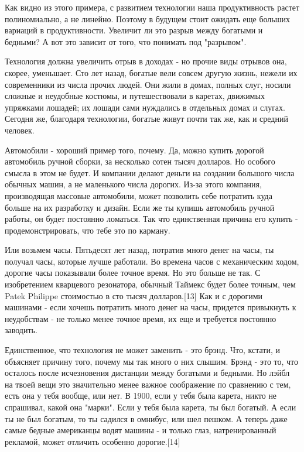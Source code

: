 \documentclass[ebook,12pt,oneside,openany]{memoir}
\begin{document}
Как видно из этого примера, с развитием технологии наша продуктивность
растет полиномиально, а не линейно. Поэтому в будущем стоит ожидать
еще больших вариаций в продуктивности. Увеличит ли это разрыв между
богатыми и бедными? А вот это зависит от того, что понимать под
"разрывом".

Технология должна увеличить отрыв в доходах - но прочие виды отрывов
она, скорее, уменьшает. Сто лет назад, богатые вели совсем другую
жизнь, нежели их современники из числа прочих людей. Они жили в домах,
полных слуг, носили сложные и неудобные костюмы, и путешествовали в
каретах, движимых упряжками лошадей; их лошади сами нуждались в
отдельных домах и слугах. Сегодня же, благодаря технологии, богатые
живут почти так же, как и средний человек.

Автомобили - хороший пример того, почему. Да, можно купить дорогой
автомобиль ручной сборки, за несколько сотен тысяч долларов. Но
особого смысла в этом не будет. И компании делают деньги на создании
большого числа обычных машин, а не маленького числа дорогих. Из-за
этого компания, производящая массовые автомобили, может позволить себе
потратить куда больше на их разработку и дизайн. Если же ты купишь
автомобиль ручной работы, он будет постоянно ломаться. Так что
единственная причина его купить - продемонстрировать, что тебе это по
карману.

Или возьмем часы. Пятьдесят лет назад, потратив много денег на часы,
ты получал часы, которые лучше работали. Во времена часов с
механическим ходом, дорогие часы показывали более точное время. Но это
больше не так. С изобретением кварцевого резонатора, обычный Таймекс
будет более точным, чем Patek Philippe стоимостью в сто тысяч
долларов.[13] Как и с дорогими машинами - если хочешь потратить много
денег на часы, придется привыкнуть к неудобствам - не только менее
точное время, их еще и требуется постоянно заводить.

Единственное, что технология не может заменить - это брэнд. Что,
кстати, и объясняет причину того, почему мы так много о них слышим.
Брэнд - это то, что осталось после исчезновения дистанции между
богатыми и бедными. Но лэйбл на твоей вещи это значительно менее
важное соображение по сравнению с тем, есть она у тебя вообще, или
нет. В 1900, если у тебя была карета, никто не спрашивал, какой она
"марки". Если у тебя была карета, ты был богатый. А если ты не был
богатым, то ты садился в омнибус, или шел пешком. А теперь даже самые
бедные американцы водят машины - и только глаз, натренированный
рекламой, может отличить особенно дорогие.[14]
\end{document}
